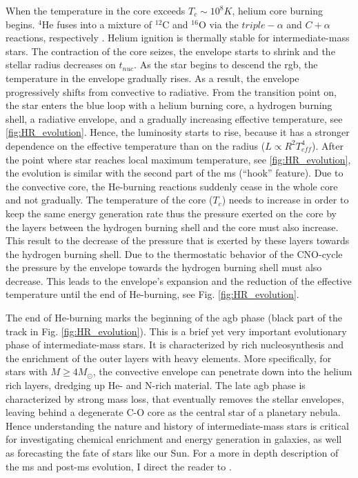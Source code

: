 When the temperature in the core exceeds $T_c \sim 10^8 K$, helium core burning begins. $^4$He fuses into a mixture of $^{12}$C and $^{16
}$O via the $triple- \alpha$ and $C+\alpha$ reactions, respectively \citep{pols2011stellar}. Helium ignition is thermally stable for intermediate-mass stars. The contraction of the core seizes, the envelope starts to shrink and the stellar radius decreases on $t_{nuc}$. As the star begins to descend the \ac{rgb}, the temperature in the envelope gradually rises. As a result, the envelope progressively shifts from convective to radiative. From the transition point on, the star enters the blue loop with a helium burning core, a hydrogen burning shell, a radiative envelope, and a gradually increasing effective temperature, see \cref{fig:HR_evolution}.  Hence, the luminosity starts to rise, because it has a stronger dependence on the effective temperature than on the radius ($L \propto R^2 T_{eff}^4$). After the point where star reaches local maximum temperature, see \cref{fig:HR_evolution}, the evolution is similar with the second part of the \ac{ms} (``hook'' feature). Due to the convective core, the He-burning reactions suddenly cease in the whole core and not gradually. The temperature of the core ($T_c$) needs to increase in order to keep the same energy generation rate thus the pressure exerted on the core by the layers between the hydrogen burning shell and the core must also increase. This result to the decrease of the pressure that is exerted by these layers towards the hydrogen burning shell. Due to the thermostatic behavior of the CNO-cycle the pressure by the envelope towards the hydrogen burning shell must also decrease. This leads to the envelope's expansion and the reduction of the effective temperature until the end of He-burning, see Fig. \ref{fig:HR_evolution}.

The end of He-burning marks the beginning of the \ac{agb} phase (black part of the track in Fig. \ref{fig:HR_evolution}). This is a brief yet very important evolutionary phase of intermediate-mass stars. It is characterized by rich nucleosynthesis and the enrichment of the outer layers with heavy elements. More specifically, for stars with $M \geq 4M_{\odot}$, the convective envelope can penetrate down into the helium rich layers, dredging up He- and N-rich material. The late \ac{agb} phase is characterized by strong mass loss, that eventually removes the stellar envelopes, leaving behind a degenerate C-O core as the central star of a planetary nebula\citep{pols2011stellar}. Hence understanding the nature and history of intermediate-mass stars is critical for investigating chemical enrichment and energy generation in galaxies, as well as forecasting the fate of stars like our Sun. For a more in depth description of the \ac{ms} and post-\ac{ms} evolution, I direct the reader to \cite{pols2011stellar}.

